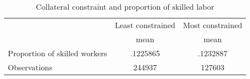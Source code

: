 \begin{table}[htbp]\centering
\def\sym#1{\ifmmode^{#1}\else\(^{#1}\)\fi}
\caption{Collateral constraint and proportion of skilled labor}
\begin{tabular}{l*{2}{c}}
\toprule
                    &\multicolumn{1}{c}{Least constrained}&\multicolumn{1}{c}{Most constrained}\\
                    &        mean&        mean\\
\midrule
Proportion of skilled workers&    .1225865&    .1232887\\
\midrule
Observations        &      244937&      127603\\
\bottomrule
\end{tabular}
\end{table}
